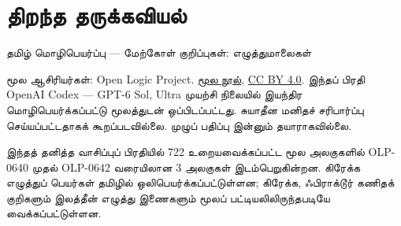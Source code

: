 \documentclass[11pt,a4paper,openany]{memoir}
\begin{document}
\raggedright
\pagestyle{plain}
\chapter*{திறந்த தருக்கவியல்}
\noindent தமிழ் மொழிபெயர்ப்பு — மேற்கோள் குறிப்புகள்: எழுத்துமாலைகள்

\noindent மூல ஆசிரியர்கள்: Open Logic Project.
\href{https://github.com/OpenLogicProject/OpenLogic}{மூல நூல்},
\href{https://creativecommons.org/licenses/by/4.0/}{CC BY 4.0}.
இந்தப் பிரதி OpenAI Codex — GPT-6 Sol, Ultra முயற்சி நிலையில்
இயந்திர மொழிபெயர்க்கப்பட்டு மூலத்துடன் ஒப்பிடப்பட்டது.
சுயாதீன மனிதச் சரிபார்ப்பு செய்யப்பட்டதாகக் கூறப்படவில்லை.
முழுப் பதிப்பு இன்னும் தயாராகவில்லை.

\noindent இந்தத் தனித்த வாசிப்புப் பிரதியில் 722 உறையவைக்கப்பட்ட மூல
அலகுகளில் OLP-0640 முதல் OLP-0642 வரையிலான 3 அலகுகள் இடம்பெறுகின்றன.
கிரேக்க எழுத்துப் பெயர்கள் தமிழில் ஒலிபெயர்க்கப்பட்டுள்ளன;
கிரேக்க, ஃபிராக்டூர் கணிதக் குறிகளும் இலத்தீன் எழுத்து இணைகளும்
மூலப் பட்டியலிலிருந்தபடியே வைக்கப்பட்டுள்ளன.

\clearpage
\tableofcontents*

\end{document}
